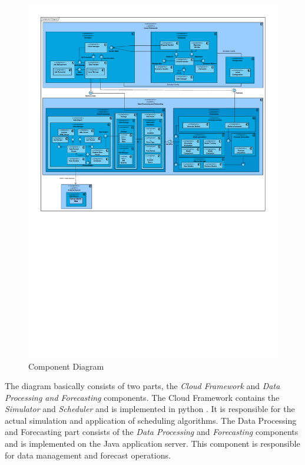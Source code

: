\begin{figure}[htbp]
	\hspace*{-0.8in}
		\includegraphics[angle=90,width=\paperheight,height=\paperwidth,keepaspectratio=true]{figures/simulation_framework/Component_Diagram.pdf}
	\caption{Component Diagram}
	\label{fig:Component_Diagram}
\end{figure}

The diagram basically consists of two parts, the \textit{Cloud Framework} and \textit{Data Processing and Forecasting} components. The Cloud Framework contains the \textit{Simulator} and \textit{Scheduler} and is implemented in python \cite{lucanin2015philharmonic}. It is responsible for the actual simulation and application of scheduling algorithms. The Data Processing and Forecasting part consists of the \textit{Data Processing} and \textit{Forecasting} components and is implemented on the Java application server. This component is responsible for data management and forecast operations.

